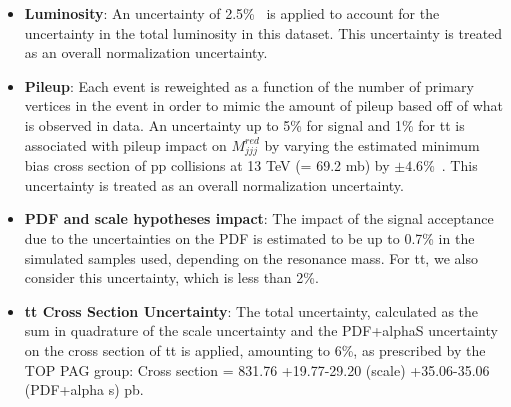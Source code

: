 \begin{itemize}

\item \textbf{Luminosity}: An uncertainty of 2.5\%~\cite{CMS-PAS-LUM-17-001} is applied to account for the uncertainty in the total luminosity in this dataset. This uncertainty is treated as an overall normalization uncertainty.

\item \textbf{Pileup}: Each event is reweighted as a function of the number of primary vertices in the event in order to mimic the amount of pileup based off of what is observed in data. An uncertainty up to 5\% for signal and 1\% for tt is associated with pileup impact on $M_{jjj}^{red}$ by varying the estimated minimum bias cross section of pp collisions at 13 TeV (= 69.2 mb) by $\pm 4.6\%$~\cite{PileupTWiki}. This uncertainty is treated as an overall normalization uncertainty.

\item \textbf{PDF and scale hypotheses impact}: The impact of the signal acceptance due to the uncertainties on the PDF is estimated to be up to 0.7\% in the simulated samples used, depending on the resonance mass. For tt, we also consider this uncertainty, which is less than 2\%.

\item \textbf{tt Cross Section Uncertainty}: The total uncertainty, calculated as the sum in quadrature of the scale uncertainty and the PDF+alphaS uncertainty on the cross section of tt is applied, amounting to 6\%, as prescribed by the TOP PAG group: Cross section = 831.76 +19.77-29.20 (scale) +35.06-35.06 (PDF+alpha s) pb. 


\end{itemize}
